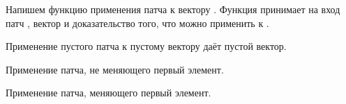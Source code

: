 Напишем функцию применения патча  к вектору
. Функция принимает на вход патч , вектор
 и доказательство того, что  можно применить
к .

\begin{code}%
\>[0]\<[2]%
\>[2] \AgdaSymbol{:}  \AgdaSymbol{\{}\AgdaSymbol{\}\{} \AgdaSymbol{:}  \AgdaSymbol{\}}  \AgdaSymbol{(} \AgdaSymbol{:}  \AgdaSymbol{)}  \AgdaSymbol{(} \AgdaSymbol{:}   \AgdaSymbol{)}        \<%
\end{code}

Применение пустого патча к пустому вектору даёт пустой вектор.

\begin{code}%
\>[0]\<[2]%
\>[2]  \AgdaInductiveConstructor{[]}  \AgdaSymbol{=} \AgdaInductiveConstructor{[]}\<%
\end{code}

Применение патча, не меняющего первый элемент.

\begin{code}%
\>[0]\<[2]%
\>[2] \AgdaSymbol{(} \AgdaSymbol{)} \AgdaSymbol{(}  \AgdaSymbol{)} \AgdaSymbol{(}  \AgdaSymbol{)} \AgdaSymbol{=}      \<%
\end{code}

Применение патча, меняющего первый элемент.

\begin{code}%
\>[0]\<[2]%
\>[2] \AgdaSymbol{(}     \AgdaSymbol{)} \AgdaSymbol{(}  \AgdaSymbol{)} \AgdaSymbol{(}   \AgdaSymbol{)} \AgdaSymbol{=} \<[51]%
\>[51]\<%
\\
\>[2]\<[4]%
\>[4]     \<%
\end{code}

